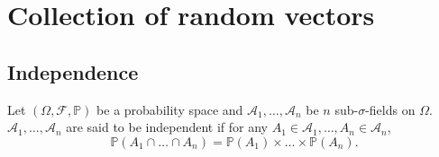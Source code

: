 \chapter{Collection of random vectors}%
\label{cha:Collection of random vectors}

\section{Independence}%
\label{sec:Independence}

\begin{definition}
    \label{def:Independent_sub-sigma-fields}
    Let $(\Omega, \mathcal{F}, \mathbb{P})$ be a probability space and $\mathcal{A}_1, \ldots,
    \mathcal{A}_n$ be $n$ sub-$\sigma$-fields on $\Omega$. $\mathcal{A}_1, \ldots, \mathcal{A}_n$
    are said to be independent if for any $A_1 \in \mathcal{A}_1, \ldots, A_n \in \mathcal{A}_n$,
    \[
    \mathbb{P}(A_1 \cap \ldots \cap A_n) = \mathbb{P}(A_1)\times \ldots \times \mathbb{P}(A_n)
    .\] 
\end{definition}

